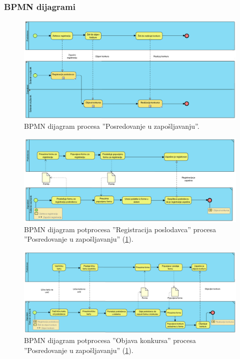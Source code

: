 \begin{mylandscape}
	\subsubsection{BPMN dijagrami}
	
	\begin{figure}[H]
		\centering
		\includegraphics[width=0.7\paperwidth]{dijagrami/bpmn-dijagrami/bpmn-7.png}
		\caption{BPMN dijagram procesa ''Posredovanje u zapo\v sljavanju''.}
		\label{bpmnd: posredovanje u zaposljavanju}
	\end{figure}
	
	\newpage
	
	\begin{figure}[H]
		\centering
		\includegraphics[width=0.7\paperwidth]{dijagrami/bpmn-dijagrami/bpmn-8.png}
		\caption{BPMN dijagram potprocesa ''Registracija poslodavca'' procesa ''Posredovanje u zapo\v sljavanju'' (\ref{bpmnd: posredovanje u zaposljavanju}).}
	\end{figure}

	\newpage
	
	\begin{figure}[H]
		\centering
		\includegraphics[width=0.7\paperwidth]{dijagrami/bpmn-dijagrami/bpmn-9.png}
		\caption{BPMN dijagram potprocesa ''Objava konkursa'' procesa ''Posredovanje u zapo\v sljavanju'' (\ref{bpmnd: posredovanje u zaposljavanju}).}
	\end{figure}


\end{mylandscape}
